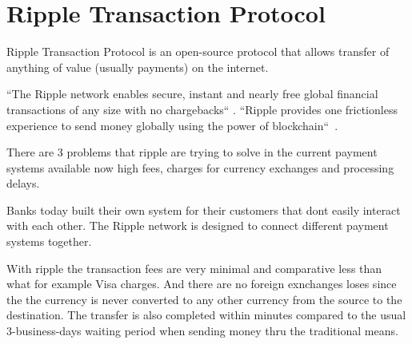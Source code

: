 \section{Ripple Transaction Protocol}

Ripple Transaction Protocol is an open-source 
protocol that allows
transfer of anything of value 
(usually payments) on the internet.

``The Ripple network enables secure, instant 
and nearly free global financial transactions 
of any size with no chargebacks``
\cite{hid-sp18-506-RippleNetwork}.
``Ripple provides one frictionless
experience to send money globally using the power of
blockchain``~\cite{hid-sp18-506-GlobalPayment}.


There are 3 problems that ripple are trying 
to solve in the current
payment systems available now
high fees, charges for currency
exchanges and processing delays.

Banks today built their own system 
for their customers that dont
easily interact with each other. 
The Ripple network is designed to
connect different payment systems together.

With ripple the transaction fees are very
minimal and comparative less than what for 
example Visa charges. And there are no foreign
exnchanges loses since the the currency is
never converted to any other currency from the
source to the destination. The transfer is
also completed within minutes compared to the 
usual 3-business-days waiting period  when 
sending money thru the traditional means.
